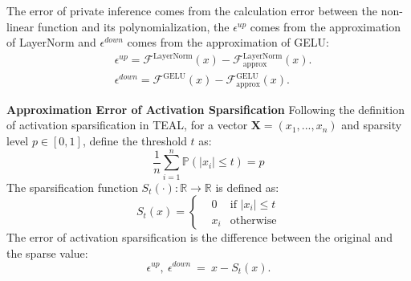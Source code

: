 
The error of private inference comes from the calculation error between the non-linear function and its polynomialization, the $\epsilon^{up}$ comes from the approximation of LayerNorm and $\epsilon^{down}$ comes from the approximation of GELU:
\begin{align*}
    \label{equation:function_approx}
    &\epsilon^{up} = \mathcal{F}^\text{LayerNorm}(x) - \mathcal{F}^\text{LayerNorm}_\text{approx}(x). \\
    &\epsilon^{down} = \mathcal{F}^\text{GELU}(x) - \mathcal{F}^\text{GELU}_\text{approx}(x). 
\end{align*}

\noindent \textbf{Approximation Error of Activation Sparsification} Following the definition of activation sparsification in TEAL\cite{liu2024training}, for a vector $\mathbf{X}=(x_1, ... , x_n)$ and sparsity level $p \in [0,1]$, define the threshold $t$ as:
\begin{equation*}
    \frac{1}{n}\sum_{i=1}^n \mathbb{P}(|x_i| \leq t) = p
\end{equation*}
The sparsification function $S_t(\cdot): \mathbb{R} \rightarrow \mathbb{R}$ is defined as:
$$ S_t(x)=\left\{\begin{aligned}
& 0  & \text{if } |x_i| \leq t \\
& x_i  & \text{otherwise} 
\end{aligned}\right.
$$
The error of activation sparsification is the difference between the original and the sparse value:
\begin{equation*}
    \label{equation:sparsification}
    \epsilon^{up},~\epsilon^{down} ~=~ x - S_t(x).
\end{equation*}

